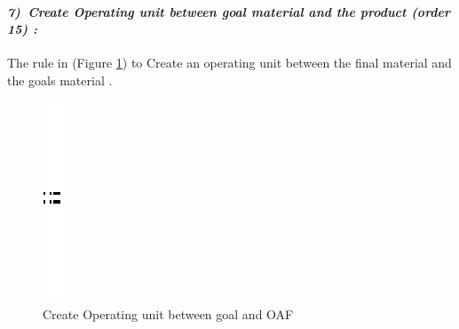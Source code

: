 \paragraph{\emph{7)~Create Operating unit between  goal material  and the product (order 15) :} }
 
 
The rule in (Figure \ref{fig:Create Operating unit between  goal and OAF}) 
to Create an operating unit  between the final material and the goals material .
  
\vspace{1cm}
\begin{figure}[th]
\centering 
	\quad{}
		\includegraphics{Chapiter3/img/sep}
	\quad{}
\caption{\label{fig:Create Operating unit between  goal and OAF}Create Operating unit between  goal and OAF}
 
\end{figure}
\vspace{1cm}


